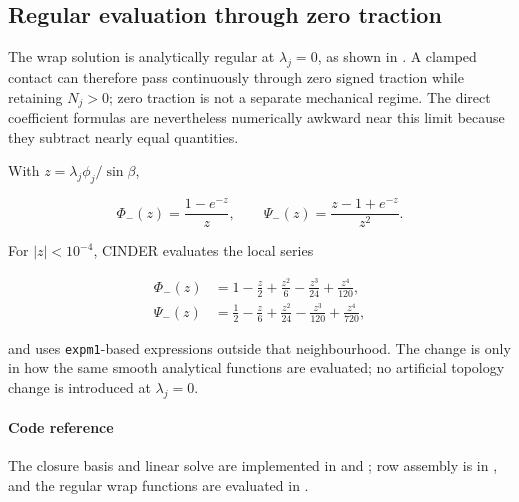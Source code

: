 \documentclass[11pt]{report}
\numberwithin{equation}{section}
\begin{document}
\subsection{Regular evaluation through zero traction}
\label{app:num_zero_traction}

The wrap solution is analytically regular at $\lambda_j=0$, as shown in
.  A clamped contact can therefore pass
continuously through zero signed traction while retaining $N_j>0$; zero
traction is not a separate mechanical regime.  The direct coefficient formulas
are nevertheless numerically awkward near this limit because they subtract
nearly equal quantities.

With $z=\lambda_j\phi_j/\sin\beta$,

\begin{equation}
    \Phi_-(z)=\frac{1-e^{-z}}{z},
    \qquad
    \Psi_-(z)=\frac{z-1+e^{-z}}{z^2}.
    \label{eq:appendix_regular_wrap_functions}
\end{equation}

For $|z|<10^{-4}$, CINDER evaluates the local series

\begin{equation}
\begin{aligned}
    \Phi_-(z)
    &=1-\frac{z}{2}+\frac{z^2}{6}-\frac{z^3}{24}+\frac{z^4}{120},\\
    \Psi_-(z)
    &=\frac{1}{2}-\frac{z}{6}+\frac{z^2}{24}-\frac{z^3}{120}+\frac{z^4}{720},
\end{aligned}
\label{eq:appendix_regular_wrap_series}
\end{equation}

and uses \texttt{expm1}-based expressions outside that neighbourhood.  The
change is only in how the same smooth analytical functions are evaluated; no
artificial topology change is introduced at $\lambda_j=0$.

\paragraph{Code reference}
The closure basis and linear solve are implemented in
 and
;
row assembly is in
,
and the regular wrap functions are evaluated in
.
\end{document}
